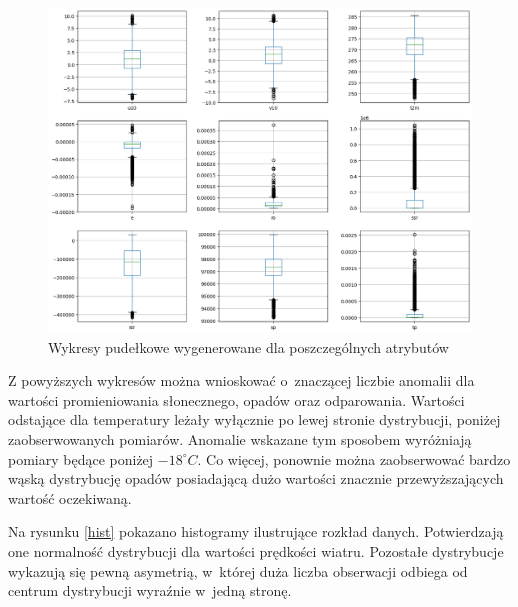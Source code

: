 \begin{figure}[H]
    \centering
    \includegraphics[width=\textwidth]{images/box.png}
    \caption[Wykresy pudełkowe]{Wykresy pudełkowe wygenerowane dla poszczególnych atrybutów}
    \label{box}
\end{figure}

Z powyższych wykresów można wnioskować o~znaczącej liczbie anomalii dla wartości promieniowania słonecznego,
opadów oraz odparowania. Wartości odstające dla temperatury leżały wyłącznie po lewej stronie dystrybucji,
poniżej zaobserwowanych pomiarów. Anomalie wskazane tym sposobem wyróżniają pomiary będące poniżej $-18^\circ C$. Co więcej, ponownie można zaobserwować bardzo wąską dystrybucję opadów posiadającą dużo wartości znacznie
przewyższających wartość oczekiwaną. 

Na rysunku \ref{hist} pokazano histogramy ilustrujące rozkład danych. Potwierdzają one normalność dystrybucji
dla wartości prędkości wiatru. Pozostałe dystrybucje wykazują się pewną asymetrią, w~której duża liczba 
obserwacji odbiega od centrum dystrybucji wyraźnie w~jedną stronę. 

